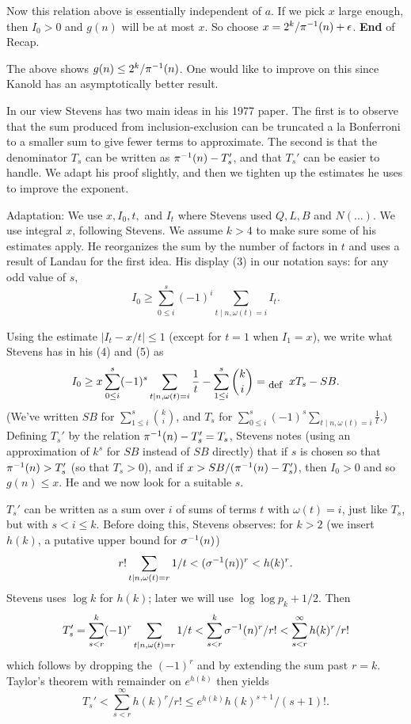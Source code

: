 \documentclass[12pt,leqno]{article}
\begin{document}
Now this relation above is essentially independent of $a$.  If 
we pick $x$ large enough, then $I_0 \gt 0$ and $g(n)$
will be at most $x$.  So choose $x = 2^k/{\pi}^{-1}(n) + \epsilon$.
\textbf{End} of Recap.
 
The above shows $g(n) \leq 2^k/{\pi}^{-1}(n)$.  One would like to improve
on this since Kanold has an asymptotically better result.

In our view Stevens has two main ideas in his 1977 paper.
The first is to observe that the 
sum produced from inclusion-exclusion can be truncated
a la Bonferroni to a smaller sum to give fewer terms to 
approximate.  The second is that the denominator $T_s$ can 
be written as ${\pi}^{-1}(n) - T_s'$, and that $T_s'$ can be easier to handle.  
We adapt his proof slightly, and then we tighten
up the estimates he uses to improve the exponent. 

Adaptation: We use $x, I_0, t,$ and $I_t$ where Stevens used $Q, L, B$ and $N(\ldots).$
We use integral $x$, following Stevens. We assume $k \gt 4$
to make sure some of his estimates apply. He reorganizes
the sum by the number of factors in $t$ and uses a result of Landau
for the first idea.  His display (3) in our notation says: for any
odd value of $s$,
$$I_0 \geq \sum_{0\leq i}^s (-1)^i \sum_{t \mid n, \omega(t)=i} I_t .$$

\newcommand{\myts}{\sum_{0 \leq i}^s (-1)^s \sum_{t \mid n, \omega(t)=i} \frac{1}{t}}  
\newcommand{\mysb}{\sum_{1 \leq i}^s {k \choose i}}
\newcommand{\dfeq}{_{\textrm{\small{def}}}=}

Using the estimate $| I_t - x/t | \leq 1$ (except for $t=1$
when $I_1 = x$), we write what Stevens has in his (4) and (5) as
$$I_0 \geq  x \myts - \mysb \eqdf xT_s - SB.$$
(We've written $SB$ for $\mysb$, and $T_s$ for $\myts$.)  Defining $T_s'$ by
the relation ${\pi}^{-1}(n) - T_s' = T_s$, Stevens notes (using an approximation
of $k^s$ for $SB$ instead of $SB$ directly) that if $s$ is chosen so that
${\pi}^{-1}(n) > T_s'$ (so that $T_s \gt 0$), and if $x > SB/({\pi}^{-1}(n) - T_s')$,
then $I_0 \gt 0$ and so $g(n) \leq x$.  He and we now look for a
suitable $s$.

$T_s'$ can be written as a sum over $i$ of sums of terms
$t$ with $\omega(t)=i$, just like $T_s$, but with $s \lt i \leq k$.
Before doing this, Stevens observes: for $k>2$
(we insert $h(k)$, a putative upper bound for ${\sigma}^{-1}(n)$)
$$r! \sum_{t \mid n, \omega(t)=r} 1/t < ({\sigma}^{-1}(n))^r < h(k)^r .$$
Stevens uses $\log k$ for $h(k)$; later we will use $\log\log p_k + 1/2$.  Then
$$T_s' = \sum_{s < r}^k (-1)^r \sum_{ t \mid n,\omega(t)=r} 1/t
<  \sum_{s < r}^k {\sigma}^{-1}(n)^r / r! < \sum_{s < r}^\infty h(k)^r/r!$$
which follows by dropping the $(-1)^r$ and by extending the sum past $r=k$.
Taylor's theorem with remainder on $e^{h(k)}$ then yields
$$T_s' \lt \sum_{s < r}^\infty h(k)^r/r! \leq e^{h(k)} h(k)^{s+1}/(s+1)! .$$
\end{document}
